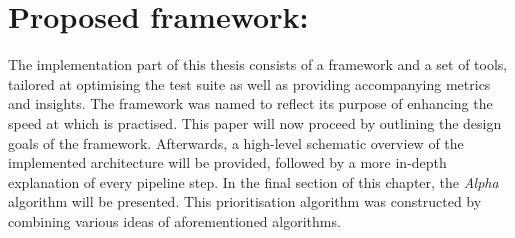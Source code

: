 
\chapter{Proposed framework: \velocity{}}
\label{chap:velocity}

The implementation part of this thesis consists of a framework and a set of tools, tailored at optimising the test suite as well as providing accompanying metrics and insights. The framework was named \emph{\velocity{}} to reflect its purpose of enhancing the speed at which \CI{} is practised. This paper will now proceed by outlining the design goals of the framework. Afterwards, a high-level schematic overview of the implemented architecture will be provided, followed by a more in-depth explanation of every pipeline step. In the final section of this chapter, the \emph{Alpha} algorithm will be presented. This prioritisation algorithm was constructed by combining various ideas of aforementioned algorithms.





